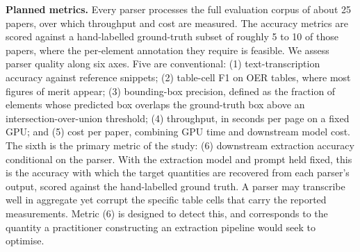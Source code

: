 \documentclass{template}
\begin{document}
\textbf{Planned metrics.} Every parser processes the full evaluation corpus of about 25 papers, over which throughput and cost are measured. The accuracy metrics are scored against a hand-labelled ground-truth subset of roughly 5 to 10 of those papers, where the per-element annotation they require is feasible. We assess parser quality along six axes. Five are conventional: (1) text-transcription accuracy against reference snippets; (2) table-cell F1 on OER tables, where most figures of merit appear; (3) bounding-box precision, defined as the fraction of elements whose predicted box overlaps the ground-truth box above an intersection-over-union threshold; (4) throughput, in seconds per page on a fixed GPU; and (5) cost per paper, combining GPU time and downstream model cost. The sixth is the primary metric of the study: (6) downstream extraction accuracy conditional on the parser. With the extraction model and prompt held fixed, this is the accuracy with which the target quantities are recovered from each parser's output, scored against the hand-labelled ground truth. A parser may transcribe well in aggregate yet corrupt the specific table cells that carry the reported measurements. Metric (6) is designed to detect this, and corresponds to the quantity a practitioner constructing an extraction pipeline would seek to optimise.
\end{document}
